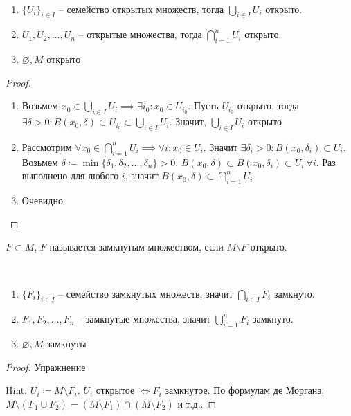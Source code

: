 \documentclass[main]{subfiles}
\begin{document}
\begin{theorem}
    \

    \begin{enumerate}
        \item $\{U_i\}_{i \in I}$ -- семейство открытых множеств, тогда $\bigcup_{i \in I} U_i$ открыто.
        \item $U_1, U_2, ..., U_n$ -- открытые множества, тогда $\bigcap_{i=1}^n U_i$  открыто.
        \item $\varnothing, M$ открыто
    \end{enumerate}
\end{theorem}
\begin{proof}
    \

    \begin{enumerate}
        \item Возьмем
              $x_0 \in \bigcup_{i \in I} U_i \implies \exists i_0: x_0 \in U_{i_0}$.
              Пусть $U_{i_0}$ открыто, тогда
              $\exists \delta > 0: B(x_0, \delta) \subset U_{i_0} \subset \bigcup_{i \in I} U_i$.
              Значит, $\bigcup_{i \in I} U_i$ открыто
        \item Рассмотрим $\forall x_0 \in \bigcap_{i=1}^n U_i \implies \forall i: x_0 \in U_i$.
              Значит $\exists \delta_i > 0: B(x_0, \delta_i) \subset U_i$.
              Возьмем $\delta \coloneqq \min \{\delta_1, \delta_2, ..., \delta_n\} > 0$.
              $B(x_0, \delta) \subset B(x_0, \delta_i) \subset U_i\ \forall i$.
              Раз выполнено для любого $i$, значит $B(x_0, \delta) \subset \bigcap_{i=1}^n U_i$
        \item Очевидно \qedhere
    \end{enumerate}
\end{proof}

\begin{definition}
    $F \subset M$, $F$ называется замкнутым множеством, если $M \setminus F$ открыто.
\end{definition}
\begin{theorem}
    \

    \begin{enumerate}
        \item $\{F_i\}_{i \in I}$ -- семейство замкнутых множеств, значит $\bigcap_{i \in I} F_i$ замкнуто.
        \item $F_1, F_2, ..., F_n$ -- замкнутые множества, значит $\bigcup_{i=1}^n F_i$ замкнуто.
        \item $\varnothing, M$ замкнуты
    \end{enumerate}
\end{theorem}
\begin{proof}
    Упражнение.

    Hint: $U_i \coloneqq M \setminus F_i$. $U_i$ открытое $\Leftrightarrow F_i$ замкнутое.
    По формулам де Моргана: $M \setminus (F_1 \cup F_2) = (M\setminus F_1) \cap (M \setminus F_2)$ и т.д..
\end{proof}
\end{document}
